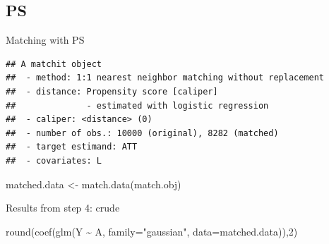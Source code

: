 \documentclass[
]{book}
\newenvironment{Shaded}{\begin{snugshade}}{\end{snugshade}}
\newcommand{\AttributeTok}[1]{\textcolor[rgb]{0.77,0.63,0.00}{#1}}
\newcommand{\ConstantTok}[1]{\textcolor[rgb]{0.00,0.00,0.00}{#1}}
\newcommand{\DecValTok}[1]{\textcolor[rgb]{0.00,0.00,0.81}{#1}}
\newcommand{\FloatTok}[1]{\textcolor[rgb]{0.00,0.00,0.81}{#1}}
\newcommand{\FunctionTok}[1]{\textcolor[rgb]{0.00,0.00,0.00}{#1}}
\newcommand{\NormalTok}[1]{#1}
\newcommand{\OtherTok}[1]{\textcolor[rgb]{0.56,0.35,0.01}{#1}}
\newcommand{\SpecialCharTok}[1]{\textcolor[rgb]{0.00,0.00,0.00}{#1}}
\newcommand{\StringTok}[1]{\textcolor[rgb]{0.31,0.60,0.02}{#1}}
\begin{document}
\hypertarget{ps-1}{%
\subsection{PS}\label{ps-1}}

Matching with PS

\begin{Shaded}
\end{Shaded}

\begin{verbatim}
## A matchit object
##  - method: 1:1 nearest neighbor matching without replacement
##  - distance: Propensity score [caliper]
##              - estimated with logistic regression
##  - caliper: <distance> (0)
##  - number of obs.: 10000 (original), 8282 (matched)
##  - target estimand: ATT
##  - covariates: L
\end{verbatim}

\begin{Shaded}
\begin{Highlighting}[]
\NormalTok{matched.data }\OtherTok{\textless{}{-}} \FunctionTok{match.data}\NormalTok{(match.obj)}
\end{Highlighting}
\end{Shaded}

Results from step 4: crude

\begin{Shaded}
\begin{Highlighting}[]
\FunctionTok{round}\NormalTok{(}\FunctionTok{coef}\NormalTok{(}\FunctionTok{glm}\NormalTok{(Y }\SpecialCharTok{\textasciitilde{}}\NormalTok{ A, }\AttributeTok{family=}\StringTok{"gaussian"}\NormalTok{, }\AttributeTok{data=}\NormalTok{matched.data)),}\DecValTok{2}\NormalTok{)}
\end{Highlighting}
\end{Shaded}
\end{document}

